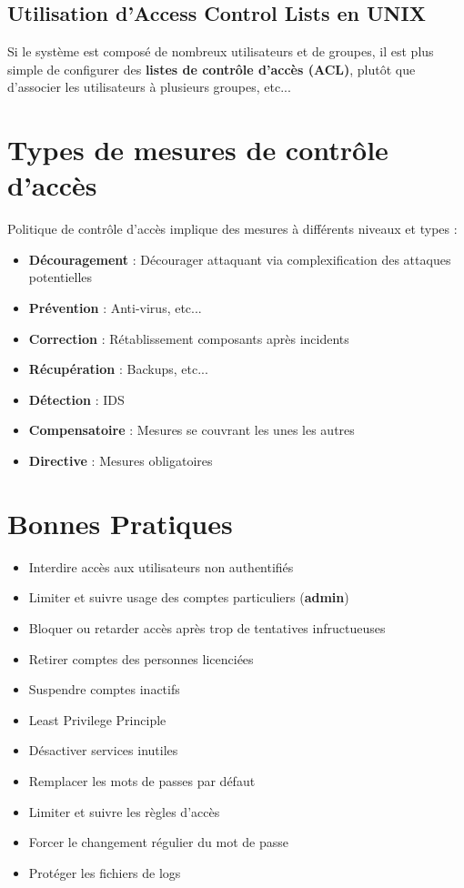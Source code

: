 \documentclass{report}
\begin{document}
		\subsection{Utilisation d'Access Control Lists en UNIX}

			Si le système est composé de nombreux utilisateurs et de groupes, il est plus simple de configurer des \textbf{listes de contrôle d'accès (ACL)}, plutôt que d'associer les utilisateurs à plusieurs groupes, etc...\\

	\section{Types de mesures de contrôle d'accès}

		Politique de contrôle d'accès implique des mesures à différents niveaux et types : \\

		\begin{itemize}
			\item \textbf{Découragement} : Décourager attaquant via complexification des attaques potentielles
			\item \textbf{Prévention} : Anti-virus, etc...
			\item \textbf{Correction} : Rétablissement composants après incidents
			\item \textbf{Récupération} : Backups, etc...
			\item \textbf{Détection} : IDS
			\item \textbf{Compensatoire} : Mesures se couvrant les unes les autres
			\item \textbf{Directive} : Mesures obligatoires\\
		\end{itemize}

	\section{Bonnes Pratiques}

		\begin{itemize}
			\item Interdire accès aux utilisateurs non authentifiés
			\item Limiter et suivre usage des comptes particuliers (\textbf{admin})
			\item Bloquer ou retarder accès après trop de tentatives infructueuses
			\item Retirer comptes des personnes licenciées
			\item Suspendre comptes inactifs
			\item Least Privilege Principle
			\item Désactiver services inutiles
			\item Remplacer les mots de passes par défaut
			\item Limiter et suivre les règles d'accès
			\item Forcer le changement régulier du mot de passe
			\item Protéger les fichiers de logs\\
		\end{itemize}
	
\end{document}
